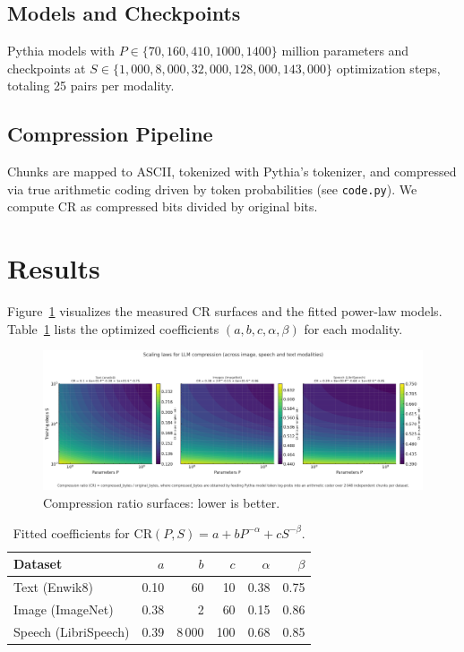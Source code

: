 \documentclass{article}
\begin{document}
\subsection{Models and Checkpoints}
Pythia models with $P\in\{70,160,410,1000,1400\}$ million parameters and checkpoints at $S\in\{1{,}000,8{,}000,32{,}000,128{,}000,143{,}000\}$ optimization steps, totaling 25 pairs per modality.

\subsection{Compression Pipeline}
Chunks are mapped to ASCII, tokenized with Pythia’s tokenizer, and compressed via true arithmetic coding driven by token probabilities (see \texttt{code.py}). We compute CR as compressed bits divided by original bits.

\section{Results}
Figure~\ref{fig:surfaces} visualizes the measured CR surfaces and the fitted power-law models. Table~\ref{tab:fits} lists the optimized coefficients $(a,b,c,\alpha,\beta)$ for each modality.

\begin{figure}[h]
  \centering
  \includegraphics[width=0.8\linewidth]{scaling_laws_for_compression.png}
  \caption{Compression ratio surfaces: lower is better.}
  \label{fig:surfaces}
\end{figure}

\begin{table}[h]
  \centering
  \begin{tabular}{lrrrrr}
    \toprule
    Dataset & $a$   & $b$     & $c$   & $\alpha$ & $\beta$ \\
    \midrule
    Text (Enwik8)       & 0.10 &    60   &   10  & 0.38 & 0.75 \\
    Image (ImageNet)    & 0.38 &     2   &   60  & 0.15 & 0.86 \\
    Speech (LibriSpeech)& 0.39 & 8\,000  &  100  & 0.68 & 0.85 \\
    \bottomrule
  \end{tabular}
  \caption{Fitted coefficients for $\mathrm{CR}(P,S)=a+bP^{-\alpha}+cS^{-\beta}$.}
  \label{tab:fits}
\end{table}
\end{document}
